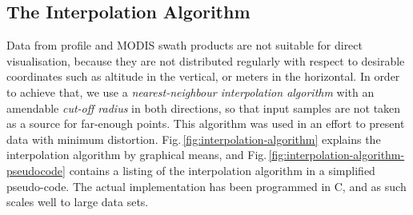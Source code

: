\subsection{The Interpolation Algorithm}\label{sec:interpolation-algorithm}
Data from profile and MODIS swath products are not suitable for direct
visualisation,
because
they are not distributed regularly with respect to desirable coordinates
such as altitude in the vertical, or meters in the horizontal. 
In order to achieve that, we
use a \textit{nearest-neighbour interpolation algorithm} with an amendable
\textit{cut-off radius}
in both directions, so that input samples are not taken as a source for
far-enough points. This
algorithm was used in an effort to present data with minimum distortion.
Fig.\,\ref{fig:interpolation-algorithm} explains the interpolation algorithm by
graphical means, and Fig.\,\ref{fig:interpolation-algorithm-pseudocode}
contains a listing of the interpolation algorithm in a simplified pseudo-code.
The actual implementation has been programmed in C, and as such scales well to
large data sets.


